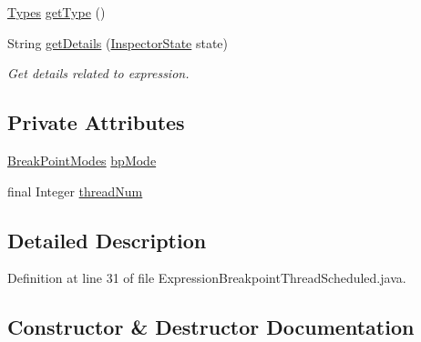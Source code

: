 \begin{DoxyCompactItemize}
\item 
\hyperlink{enumgov_1_1nasa_1_1jpf_1_1inspector_1_1server_1_1expression_1_1_types}{Types} \hyperlink{classgov_1_1nasa_1_1jpf_1_1inspector_1_1server_1_1expression_1_1_expression_boolean_aed010ff8683eb1e8621e226703133457}{get\+Type} ()
\item 
String \hyperlink{classgov_1_1nasa_1_1jpf_1_1inspector_1_1server_1_1expression_1_1_expression_boolean_a43423e204404f24bf7862de938598eb7}{get\+Details} (\hyperlink{interfacegov_1_1nasa_1_1jpf_1_1inspector_1_1server_1_1expression_1_1_inspector_state}{Inspector\+State} state)
\begin{DoxyCompactList}\small\item\em Get details related to expression. \end{DoxyCompactList}\end{DoxyCompactItemize}
\subsection*{Private Attributes}
\begin{DoxyCompactItemize}
\item 
\hyperlink{enumgov_1_1nasa_1_1jpf_1_1inspector_1_1server_1_1breakpoints_1_1_break_point_modes}{Break\+Point\+Modes} \hyperlink{classgov_1_1nasa_1_1jpf_1_1inspector_1_1server_1_1expression_1_1expressions_1_1_expression_breakpoint_thread_scheduled_af02859d11279a41920bbebb982288795}{bp\+Mode}
\item 
final Integer \hyperlink{classgov_1_1nasa_1_1jpf_1_1inspector_1_1server_1_1expression_1_1expressions_1_1_expression_breakpoint_thread_scheduled_ada71b9ee313dfce2cd7b53c32cb0d3a8}{thread\+Num}
\end{DoxyCompactItemize}


\subsection{Detailed Description}


Definition at line 31 of file Expression\+Breakpoint\+Thread\+Scheduled.\+java.



\subsection{Constructor \& Destructor Documentation}
